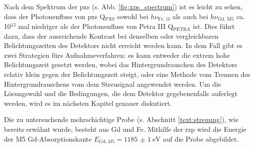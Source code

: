 \noindent
Nach dem Spektrum der \gls{pxs} (s. Abb. \ref{fig:xps_spectrum}) ist es leicht zu sehen, dass der Photonenfluss von \gls{pxs} Q$_{\text{PXS}}$ sowohl bei $h\nu_{\text{Fe, l3}}$ als auch bei $h\nu_{\text{Gd, M5}}$ ca. 10$^{13}$ mal niedriger als der Photonenfluss von Petra III Q$_\text{PETRA}$ ist. Dies führt dazu, dass der ausreichende Kontrast bei denselben oder vergleichbaren Belichtungszeiten des Detektors nicht erreicht werden kann. In dem Fall gibt es zwei Strategien fürs Aufnahmeverfahren: es kann entweder die extrem hohe Belichtungszeit gesetzt werden, wobei das Hintergrundrauschen des Detektors relativ klein gegen der Belichtungszeit steigt, oder eine Methode vom Trennen des Hintergrundrauschens vom dem Streusignal angewendet werden. Um die Lösungswahl und die Bedingungen, die dem Detektor gegebenenfalls auferlegt werden, wird es im nächsten Kapitel genauer diskutiert. 

\noindent
Die zu untersuchende mehrschichtige Probe (s. Abschnitt \ref{text:streuung}), wie bereits erwähnt wurde, besteht aus Gd und Fe. Mithilfe der \gls{rzp} wird die Energie der M5 Gd-Absorptionskante $E_{Gd, M5} = \SI{1185(1)}{\eV}$ \cite[Abb. 6(a)]{prieto_x-ray_2005} auf die Probe abgebildet.